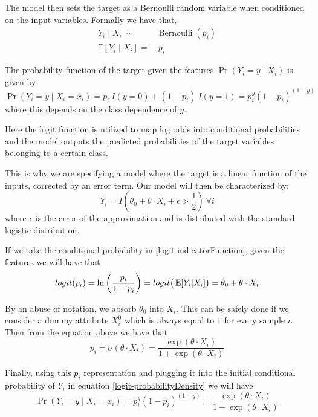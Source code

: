 The model then sets the target as a Bernoulli random variable when conditioned on the input variables.
Formally we have that,
\begin{equation}
\begin{split}
Y_i \mid X_i \ \sim & \operatorname{Bernoulli}(p_i) \\
\mathbb{E}[Y_i \mid X_i ] = & \ p_i
\end{split}
\end{equation}


The probability function of the target given the features $\Pr(Y_i=y\mid X_i)$ is given by
\begin{equation}
\Pr(Y_i=y \mid X_i = x_i) = p_i \ I(y=0) + (1-p_i) \ I(y=1) = p_i^{y} {(1-p_i)}^{(1-y)}
\label{logit-probabilityDensity}
\end{equation}
where this depends on the class dependence of $y$.

Here the logit function is utilized to map log odds into conditional probabilities and the model outputs the predicted probabilities of the target variables belonging to a certain class.

This is why we are specifying a model where the target is a linear function of the inputs, corrected by an error term.
Our model will then be characterized by:
\begin{equation}
Y_i = I(\theta_0 + \theta \cdot X_i + \epsilon > \frac{1}{2}) \ \forall i
\label{logit-indicatorFunction}
\end{equation}
where $\epsilon$ is the error of the approximation and is distributed with the standard logistic distribution.

If we take the conditional probability in \cref{logit-indicatorFunction}, given the features we will have that
\begin{equation}
logit(p_i)= \ln \left(\frac{p_i}{1-p_i} \right) = logit\big( \operatorname{\mathbb{E}}[Y_i| X_i] \big) = \theta_0 + \theta \cdot X_i
\end{equation}

By an abuse of notation, we absorb $\theta_0$ into $X_i$.
This can be safely done if we consider a dummy attribute $X_i^0$ which is always equal to $1$ for every sample $i$.
Then from the equation above we have that
\begin{equation}
p_i = \sigma(\theta \cdot X_i) = \frac{\exp(\theta \cdot X_i) }{1 + \exp(\theta \cdot X_i)}
\end{equation}

Finally, using this $p_i$ representation and plugging it into the initial conditional probability of $Y_i$ in equation \cref{logit-probabilityDensity} we will have
\begin{equation}
 \Pr(Y_i=y \mid X_i = x_i) = p_i^{y} {(1-p_i)}^{(1-y)} = \frac{\exp(\theta \cdot X_i) }{1 + \exp(\theta \cdot X_i)}
 \end{equation}



